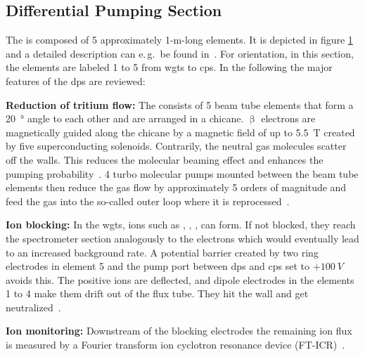 \subsection{Differential Pumping Section}
\label{sec:katrinExpSetupDiffPumpingSection}
\begin{figure}[t]
 \label{fig:katrinExpSetupDiffPumpingSection}
\end{figure}
The  is composed of 5 approximately 1-m-long elements. It is depicted in figure \ref{fig:katrinExpSetupDiffPumpingSection} and a detailed description can e.\,g.~be found in~\cite{Kosmider2012}. For orientation, in this section, the elements are labeled 1 to 5 from \gls{wgts} to \gls{cps}. In the following the major features of the \gls{dps} are reviewed:

{\par\textbf{Reduction of tritium flow:}
The  consists of 5 beam tube elements that form a \SI{20}{\degree} angle to each other and are arranged in a chicane. $\upbeta$ electrons are magnetically guided along the chicane by a magnetic field of up to \SI{5.5}{T} created by five superconducting solenoids. Contrarily, the neutral gas molecules scatter off the walls. This reduces the molecular beaming effect and enhances the pumping probability~\cite{ZHANG2012}. 4 turbo molecular pumps mounted between the beam tube elements then reduce the gas flow by approximately 5 orders of magnitude and feed the gas into the so-called outer loop where it is reprocessed~\cite{Kosmider2012}.}

{\par\textbf{Ion blocking:}
In the \gls{wgts}, ions such as , , ,  can form. If not blocked, they reach the spectrometer section analogously to the electrons which would eventually lead to an increased background rate. A potential barrier created by two ring electrodes in element 5 and the pump port between \gls{dps} and \gls{cps} set to $+\SI{100}{V}$ avoids this. The positive ions are deflected, and dipole electrodes in the elements 1 to 4 make them drift out of the flux tube. They hit the wall and get neutralized~\cite{Klein2019}.}

{\par\textbf{Ion monitoring:}
Downstream of the blocking electrodes the remaining ion flux is measured by a Fourier transform ion cyclotron resonance device (FT-ICR)~\cite{Ubieto2009}.}
